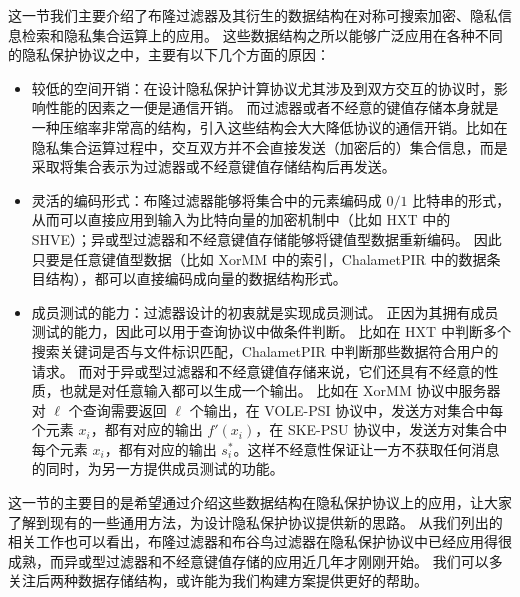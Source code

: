 这一节我们主要介绍了布隆过滤器及其衍生的数据结构在对称可搜索加密、隐私信息检索和隐私集合运算上的应用。
这些数据结构之所以能够广泛应用在各种不同的隐私保护协议之中，主要有以下几个方面的原因：
\begin{itemize}
  \item 较低的空间开销：在设计隐私保护计算协议尤其涉及到双方交互的协议时，影响性能的因素之一便是通信开销。
  而过滤器或者不经意的键值存储本身就是一种压缩率非常高的结构，引入这些结构会大大降低协议的通信开销。比如在隐私集合运算过程中，交互双方并不会直接发送（加密后的）集合信息，而是采取将集合表示为过滤器或不经意键值存储结构后再发送。
  \item 灵活的编码形式：布隆过滤器能够将集合中的元素编码成 $0/1$ 比特串的形式，从而可以直接应用到输入为比特向量的加密机制中（比如 HXT 中的 SHVE）；异或型过滤器和不经意键值存储能够将键值型数据重新编码。
  因此只要是任意键值型数据（比如 XorMM 中的索引，ChalametPIR 中的数据条目结构），都可以直接编码成向量的数据结构形式。
  \item 成员测试的能力：过滤器设计的初衷就是实现成员测试。
  正因为其拥有成员测试的能力，因此可以用于查询协议中做条件判断。
  比如在 HXT 中判断多个搜索关键词是否与文件标识匹配，ChalametPIR 中判断那些数据符合用户的请求。
  而对于异或型过滤器和不经意键值存储来说，它们还具有不经意的性质，也就是对任意输入都可以生成一个输出。
  比如在 XorMM 协议中服务器对 $\ell$ 个查询需要返回 $\ell$ 个输出，在 VOLE-PSI 协议中，发送方对集合中每个元素 $x_i$，都有对应的输出 $f'(x_i)$，在 SKE-PSU 协议中，发送方对集合中每个元素 $x_i$，都有对应的输出 $s_i^*$。这样不经意性保证让一方不获取任何消息的同时，为另一方提供成员测试的功能。
\end{itemize}



这一节的主要目的是希望通过介绍这些数据结构在隐私保护协议上的应用，让大家了解到现有的一些通用方法，为设计隐私保护协议提供新的思路。
从我们列出的相关工作也可以看出，布隆过滤器和布谷鸟过滤器在隐私保护协议中已经应用得很成熟，而异或型过滤器和不经意键值存储的应用近几年才刚刚开始。
我们可以多关注后两种数据存储结构，或许能为我们构建方案提供更好的帮助。


